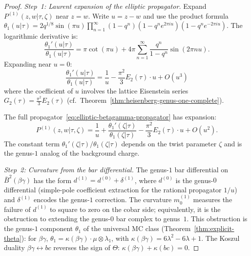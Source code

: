\begin{proof}
\emph{Step~1: Laurent expansion of the elliptic propagator.}
Expand $P^{(1)}(z,w|\tau,\zeta)$ near $z = w$. Write
$u = z - w$ and use the product formula
$\theta_1(u|\tau) = 2q^{1/8}\sin(\pi u)
\prod_{n=1}^\infty (1-q^n)(1-q^n e^{2\pi i u})(1-q^n e^{-2\pi i u})$.
The logarithmic derivative is:
\begin{equation}\label{eq:logderiv-theta1}
\frac{\theta_1'(u|\tau)}{\theta_1(u|\tau)}
= \pi \cot(\pi u) + 4\pi \sum_{n=1}^\infty
\frac{q^n}{1-q^n} \sin(2\pi n u).
\end{equation}
Expanding near $u = 0$:
\[
\frac{\theta_1'(u|\tau)}{\theta_1(u|\tau)}
= \frac{1}{u} - \frac{\pi^2}{3} E_2(\tau) \cdot u + O(u^3)
\]
where the coefficient of $u$ involves the lattice Eisenstein series
$G_2(\tau) = \frac{\pi^2}{3} E_2(\tau)$
(cf.\ Theorem~\ref{thm:heisenberg-genus-one-complete}).

The full propagator~\eqref{eq:elliptic-betagamma-propagator}
has expansion:
\begin{equation}\label{eq:betagamma-propagator-expansion}
P^{(1)}(z,w|\tau,\zeta) = \frac{1}{u}
+ \frac{\theta_1'(\zeta|\tau)}{\theta_1(\zeta|\tau)}
- \frac{\pi^2}{3} E_2(\tau) \cdot u + O(u^2).
\end{equation}
The constant term $\theta_1'(\zeta|\tau)/\theta_1(\zeta|\tau)$
depends on the twist parameter $\zeta$ and is the genus-$1$ analog
of the background charge.

\emph{Step~2: Curvature from the bar differential.}
The genus-$1$ bar differential on $\bar{B}^2(\beta\gamma)$ has the
form $d^{(1)} = d^{(0)} + \delta^{(1)}$, where $d^{(0)}$ is the
genus-$0$ differential (simple-pole coefficient extraction for the
rational propagator $1/u$)
and $\delta^{(1)}$ encodes the genus-$1$ correction. The
curvature $m_0^{(1)}$ measures the failure of $d^{(1)}$ to
square to zero on the cobar side; equivalently, it is the
obstruction to extending the genus-$0$ bar complex to genus~$1$.
This obstruction is the genus-$1$ component $\theta_1$ of the
universal MC class (Theorem~\ref{thm:explicit-theta}):
for $\beta\gamma$, $\theta_1 = \kappa(\beta\gamma) \cdot \mu
\otimes \lambda_1$, with $\kappa(\beta\gamma) =
6\lambda^2 - 6\lambda + 1$.
The Koszul duality $\beta\gamma \leftrightarrow bc$ reverses the
sign of $\Theta$: $\kappa(\beta\gamma) + \kappa(bc) = 0$.


\end{proof}
